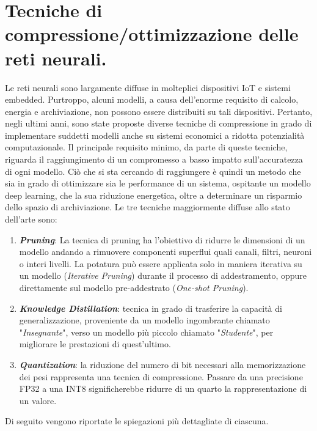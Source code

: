 \section{Tecniche di compressione/ottimizzazione delle reti neurali.}
Le reti neurali sono largamente diffuse in molteplici dispositivi IoT e sistemi 
embedded. Purtroppo, alcuni modelli, a causa dell'enorme requisito 
di calcolo, energia e archiviazione, non possono essere distribuiti su tali 
dispositivi. Pertanto, negli ultimi anni, sono state proposte diverse tecniche 
di compressione in grado di implementare suddetti modelli anche su sistemi 
economici a ridotta potenzialità computazionale. Il principale requisito 
minimo, da parte di queste tecniche, riguarda il raggiungimento di un compromesso 
a basso impatto sull'accuratezza di ogni modello. Ciò che si sta 
cercando di raggiungere è quindi un metodo che sia in grado di ottimizzare 
sia le performance di un sistema, ospitante un modello deep learning, che la 
sua riduzione energetica, oltre a determinare un risparmio dello spazio di 
archiviazione. Le tre tecniche maggiormente diffuse allo stato dell'arte sono:
\begin{enumerate}
    \item {\bfseries{\emph{Pruning}}}: La tecnica di pruning ha l'obiettivo di ridurre le dimensioni 
    di un modello andando a rimuovere componenti superflui quali canali, 
    filtri, neuroni o interi livelli. La potatura può essere applicata solo in 
    maniera iterativa su un modello (\emph{Iterative Pruning}) durante il processo 
    di addestramento, oppure direttamente sul modello pre-addestrato 
    (\emph{One-shot Pruning}).
    \item {\bfseries{\emph{Knowledge Distillation}}}: tecnica in grado di trasferire la capacità 
    di generalizzazione, proveniente da un modello ingombrante chiamato 
    "\emph{Insegnante}", verso un modello più piccolo chiamato "\emph{Studente}", per 
    migliorare le prestazioni di quest'ultimo.
    \item {\bfseries{\emph{Quantization}}}: la riduzione del numero di bit necessari 
    alla memorizzazione dei pesi rappresenta una tecnica di compressione. Passare da 
    una precisione FP32 a una INT8 significherebbe ridurre di un quarto 
    la rappresentazione di un valore.
\end{enumerate}
Di seguito vengono riportate le spiegazioni più dettagliate di ciascuna.

